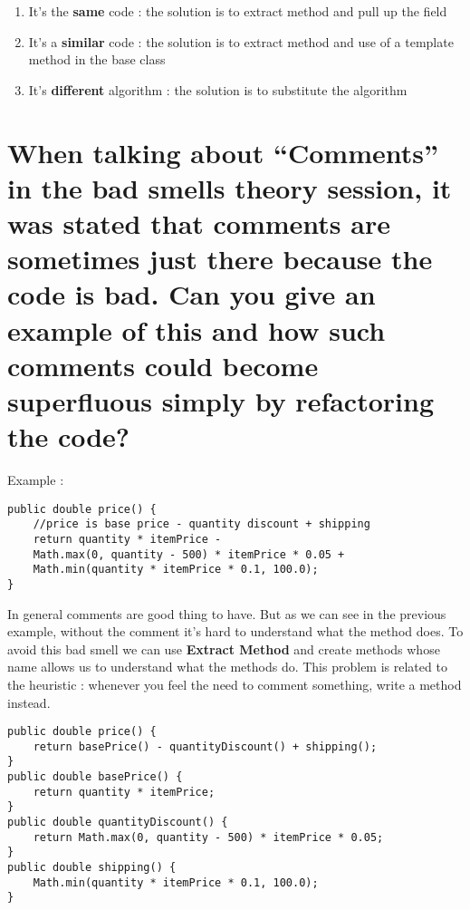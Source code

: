 \begin{enumerate}
\item It's the \textbf{same} code : the solution is to extract method and pull up the field
\item It's a \textbf{similar} code : the solution is to extract method and use of a template method in the base class
\item It's \textbf{different} algorithm : the solution is to substitute the algorithm
\end{enumerate}






\section{When talking about “Comments” in the bad smells theory session, it was stated that comments are sometimes just there because the code is bad. Can you give an example of this and how such comments could become superfluous simply by refactoring the code?}

Example : \\

\begin{lstlisting}
public double price() {
	//price is base price - quantity discount + shipping
    return quantity * itemPrice -
    Math.max(0, quantity - 500) * itemPrice * 0.05 +
    Math.min(quantity * itemPrice * 0.1, 100.0);
}
\end{lstlisting}

In general comments are good thing to have. But as we can see in the previous example, without the comment it's hard to understand what the method does. To avoid this bad smell we can use \textbf{Extract Method} and create methods whose name allows us to understand what the methods do. This problem is related to the heuristic : whenever you feel the need to comment something, write a method instead.

\begin{lstlisting}
public double price() {
	return basePrice() - quantityDiscount() + shipping();
}
public double basePrice() {
	return quantity * itemPrice;
}
public double quantityDiscount() {
	return Math.max(0, quantity - 500) * itemPrice * 0.05;
}
public double shipping() {
	Math.min(quantity * itemPrice * 0.1, 100.0);
}
\end{lstlisting}
